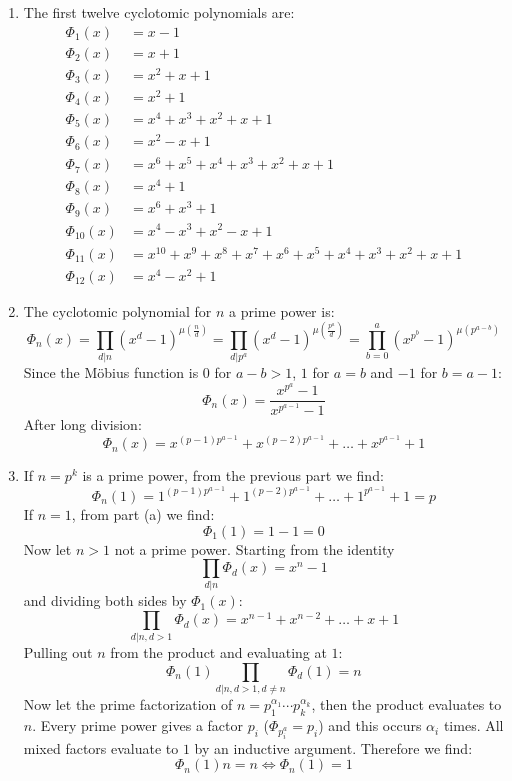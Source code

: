 \begin{solution}
    \begin{enumerate}[label=(\alph*)]
        \item The first twelve cyclotomic polynomials are:
        \begin{align*}
            \Phi_1(x) &= x - 1 \\
            \Phi_2(x) &= x +1 \\
            \Phi_3(x) &=x^2+x+1\\
            \Phi_4(x) &= x^2+1 \\
            \Phi_5(x) &=x^4+x^3+x^2+x+1\\
            \Phi_6(x) &= x^2-x+1\\
            \Phi_7(x) &=x^6+x^5+x^4+x^3+x^2+x+1 \\
            \Phi_8(x) &=x^4+1\\
            \Phi_9(x) &=x^6+x^3+1\\
            \Phi_{10}(x) &=x^4-x^3+x^2-x+1\\
            \Phi_{11}(x) &=x^{10}+x^9+x^8+x^7+x^6+x^5+x^4+x^3+x^2+x+1 \\
            \Phi_{12}(x) &=x^4-x^2+1
        \end{align*}
        \item The cyclotomic polynomial for $n$ a prime power is:
        \[
            \Phi_n(x) = \prod_{d\vert n} (x^d - 1)^{\mu\left(\frac{n}{d}\right)} = \prod_{d\vert p^a} (x^d - 1)^{\mu\left(\frac{p^a}{d}\right)} = \prod_{b=0}^a (x^{p^b} - 1)^{\mu(p^{a-b})} 
        \]
        Since the M{\"o}bius function is $0$ for $a-b > 1$, $1$ for $a=b$ and $-1$ for $b=a-1$:
        \[
            \Phi_n(x) = \frac{x^{p^a} - 1}{x^{p^{a-1}} - 1} 
        \]
        After long division:
        \[
            \Phi_n(x) = x^{(p-1)p^{a-1}} + x^{(p-2)p^{a-1}} + \ldots + x^{p^{a-1}} + 1
        \]
        \item If $n=p^k$ is a prime power, from the previous part we find:
        \[
            \Phi_n(1) = 1^{(p-1)p^{a-1}} + 1^{(p-2)p^{a-1}} + \ldots + 1^{p^{a-1}} + 1 = p
        \]
        If $n=1$, from part (a) we find:
        \[
            \Phi_1(1) = 1- 1= 0
        \]
        Now let $n >1$ not a prime power. Starting from the identity
        \[
            \prod_{d\vert n}\Phi_d(x) = x^n -1
        \]
        and dividing both sides by $\Phi_1(x)$:
        \[
            \prod_{d\vert n, d>1}\Phi_d(x) = x^{n-1}+ x^{n-2}+ \ldots +x + 1
        \]
        Pulling out $n$ from the product and evaluating at $1$:
        \[
            \Phi_n(1) \prod_{d\vert n, d>1, d\neq n} \Phi_d(1) = n
        \]
        Now let the prime factorization of $n = p_1^{\alpha_1}\cdots p_k^{\alpha_k}$, then the product evaluates to $n$. Every prime power gives a factor $p_i$ ($\Phi_{p_i^a} = p_i$) and this occurs $\alpha_i$ times. All mixed factors evaluate to $1$ by an inductive argument. Therefore we find:
        \[
            \Phi_n(1) n = n \Longleftrightarrow \Phi_n(1) = 1
        \]
    \end{enumerate}
\end{solution}

